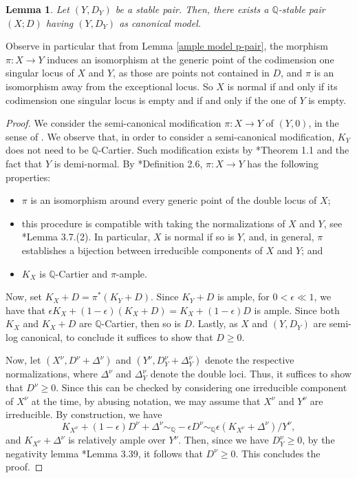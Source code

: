 \documentclass{amsart}
\newcommand{\bQ}{\mathbb{Q}}
\newtheorem{Lemma}[theorem]{Lemma}
\theoremstyle{definition}
\newcommand{\rar}{\rightarrow}
\def\K#1.{K_{#1}}
\renewcommand{\qq}{\mathbb{Q}}
\begin{document}
\begin{Lemma} \label{lift stable pair slc}
Let $(Y,D_Y)$ be a stable pair.
Then, there exists a $\bQ$-stable pair $(X;D)$ having $(Y,D_Y)$ as canonical model.
\end{Lemma}
 Observe in particular that from Lemma \ref{ample model p-pair}, the morphism $\pi \colon X\to Y$ induces an isomorphism at the generic point of the codimension one singular locus of $X$ and $Y$, as those are points not contained in $D$, and $\pi$ is an isomorphism away from the exceptional locus. So $X$ is normal if and only if its codimension one singular locus is empty and if and only if the one of $Y$ is empty.

\begin{proof}
We consider the semi-canonical modification $\pi \colon X \rar Y$ of $(Y,0)$, in the sense of \cite{Fuj15}.
We observe that, in order to consider a semi-canonical modification, $K_Y$ does not need to be $\qq$-Cartier.
Such modification exists by \cite{Fuj15}*{Theorem 1.1} and the fact that $Y$ is demi-normal.
By \cite{Fuj15}*{Definition 2.6}, $\pi \colon X \rar Y$ has the following properties:
\begin{itemize}
    \item $\pi$ is an isomorphism around every generic point of the double locus of $X$;
    \item this procedure is compatible with taking the normalizations of $X$ and $Y$, see \cite{Fuj15}*{Lemma 3.7.(2)}.
    In particular, $X$ is normal if so is $Y$, and, in general, $\pi$ establishes a bijection between irreducible components of $X$ and $Y$; and
    \item $K_X$ is $\qq$-Cartier and $\pi$-ample.
\end{itemize}
Now, set $K_X + D = \pi^*(K_Y+D)$.
Since $K_Y+D$ is ample, for $0 < \epsilon \ll 1$, we have that $\epsilon K_X + (1-\epsilon)(K_X+D)=K_X + (1-\epsilon)D$ is ample.
Since both $K_X$ and $K_X+D$ are $\qq$-Cartier, then so is $D$.
Lastly, as $X$ and $(Y,D_Y)$ are semi-log canonical, to conclude it suffices to show that $D \geq 0$.

Now, let $(X^\nu,D^\nu + \Delta^\nu)$ and $(Y^\nu,D_Y^\nu + \Delta^\nu_Y)$ denote the respective normalizations, where $\Delta^\nu$ and $\Delta_Y^\nu$ denote the double loci.
Thus, it suffices to show that $D^\nu \geq 0$.
Since this can be checked by considering one irreducible component of $X^\nu$ at the time, by abusing notation, we may assume that $X^\nu$ and $Y^\nu$ are irreducible.
By construction, we have
\[
\K X^\nu. + (1-\epsilon)D^\nu + \Delta^\nu \sim_{\qq}-\epsilon D^\nu \sim_{\qq} \epsilon(\K X^\nu. + \Delta^\nu) /Y^\nu,
\]
and $\K X^\nu. + \Delta^\nu$ is relatively ample over $Y^\nu$.
Then, since we have $D^\nu_Y \geq 0$, by the negativity lemma \cite{KM98}*{Lemma 3.39}, it follows that $D^\nu \geq 0$.
This concludes the proof.
\end{proof}
\end{document}
